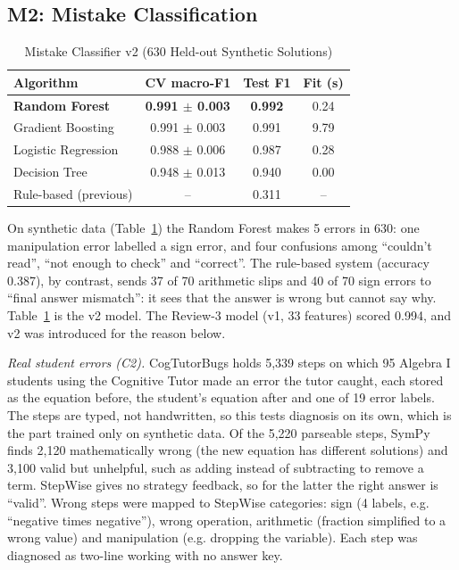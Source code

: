 \documentclass[conference]{IEEEtran}
\begin{document}
\subsection{M2: Mistake Classification}
\begin{table}[!t]
\caption{Mistake Classifier v2 (630 Held-out Synthetic Solutions)}
\label{tab:mistake}
\centering
\footnotesize
\begin{tabular}{lccc}
\toprule
Algorithm & CV macro-F1 & Test F1 & Fit (s)\\
\midrule
\textbf{Random Forest} & \textbf{0.991 $\pm$ 0.003} & \textbf{0.992} & 0.24\\
Gradient Boosting & 0.991 $\pm$ 0.003 & 0.991 & 9.79\\
Logistic Regression & 0.988 $\pm$ 0.006 & 0.987 & 0.28\\
Decision Tree & 0.948 $\pm$ 0.013 & 0.940 & 0.00\\
Rule-based (previous) & -- & 0.311 & --\\
\bottomrule
\end{tabular}
\end{table}

On synthetic data (Table~\ref{tab:mistake}) the Random Forest makes 5 errors in 630: one manipulation error labelled a sign error, and four confusions among ``couldn't read'', ``not enough to check'' and ``correct''. The rule-based system (accuracy 0.387), by contrast, sends 37 of 70 arithmetic slips and 40 of 70 sign errors to ``final answer mismatch'': it sees that the answer is wrong but cannot say why. Table~\ref{tab:mistake} is the v2 model. The Review-3 model (v1, 33 features) scored 0.994, and v2 was introduced for the reason below.

\textit{Real student errors (C2).} CogTutorBugs \cite{cogtutorbugs} holds 5,339 steps on which 95 Algebra I students using the Cognitive Tutor made an error the tutor caught, each stored as the equation before, the student's equation after and one of 19 error labels. The steps are typed, not handwritten, so this tests diagnosis on its own, which is the part trained only on synthetic data. Of the 5,220 parseable steps, SymPy finds 2,120 mathematically wrong (the new equation has different solutions) and 3,100 valid but unhelpful, such as adding instead of subtracting to remove a term. StepWise gives no strategy feedback, so for the latter the right answer is ``valid''. Wrong steps were mapped to StepWise categories: sign (4 labels, e.g. ``negative times negative''), wrong operation, arithmetic (fraction simplified to a wrong value) and manipulation (e.g. dropping the variable). Each step was diagnosed as two-line working with no answer key.
\end{document}
